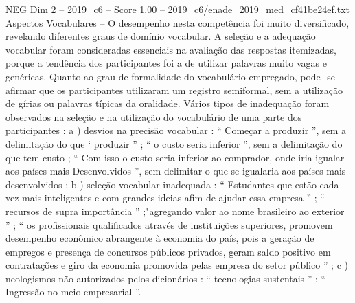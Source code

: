 \begin{textsample}{NEG Dim 2 – 2019\_c6 – Score 1.00 – 2019\_c6/enade\_2019\_med\_cf41be24ef.txt}
Aspectos Vocabulares – O desempenho nesta competência foi muito diversificado, revelando diferentes graus de domínio vocabular.
A seleção e a adequação vocabular foram consideradas essenciais na avaliação das respostas itemizadas, porque a tendência dos participantes foi a de utilizar palavras muito vagas e genéricas.
Quanto ao grau de formalidade do vocabulário empregado, pode -se afirmar que os participantes utilizaram um registro semiformal, sem a utilização de gírias ou palavras típicas da oralidade.
Vários tipos de inadequação foram observados na seleção e na utilização do vocabulário de uma parte dos participantes : a ) desvios na precisão vocabular : “ Começar a produzir ”, sem a delimitação do que ‘ produzir ” ; “ o custo seria inferior ”, sem a delimitação do que tem custo ; “ Com isso o custo seria inferior ao comprador, onde iria igualar aos países mais Desenvolvidos ”, sem delimitar o que se igualaria aos países mais desenvolvidos ; b ) seleção vocabular inadequada : “ Estudantes que estão cada vez mais inteligentes e com grandes ideias afim de ajudar essa empresa ” ; “ recursos de supra importância ” ;"agregando valor ao nome brasileiro ao exterior ” ; “ os profissionais qualificados através de instituições superiores, promovem desempenho econômico abrangente à economia do país, pois a geração de empregos e presença de concursos públicos privados, geram saldo positivo em contratações e giro da economia promovida pelas empresa do setor público ” ; c ) neologismos não autorizados pelos dicionários : “ tecnologias sustentais ” ; “ Ingressão no meio empresarial ”.

\end{textsample}
